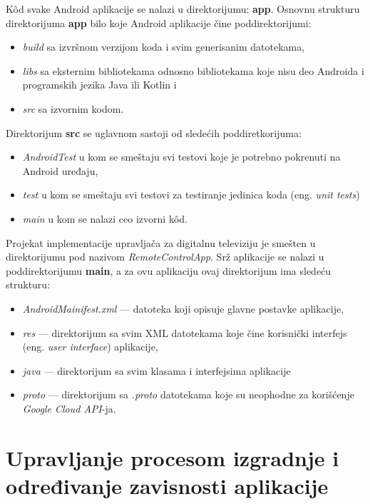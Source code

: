 \documentclass[implementacija.tex]{subfiles}
\begin{document}
K\^{o}d svake Android aplikacije se nalazi u direktorijumu: \textbf{app}. Osnovnu strukturu direktorijuma \textbf{app} bilo koje Android aplikacije čine poddirektorijumi: 

\begin{itemize}
\item \textit{build} sa izvršnom verzijom koda i svim generisanim datotekama,
\item \textit{libs} sa eksternim bibliotekama odnosno bibliotekama koje nisu deo Androida i programskih jezika Java ili Kotlin i
\item \textit{src} sa izvornim kodom.
\end{itemize}

 Direktorijum \textbf{src} se uglavnom sastoji od sledećih poddiretkorijuma: 
\begin{itemize}
\item \textit{AndroidTest} u kom se smeštaju svi testovi koje je potrebno pokrenuti na Android uređaju, 
\item \textit{test} u kom se smeštaju svi testovi za testiranje jedinica koda (eng. \textit{unit tests})
\item \textit{main} u kom se nalazi ceo izvorni k\^{o}d.
\end{itemize}

Projekat implementacije upravljača za digitalnu televiziju je smešten u direktorijumu pod nazivom \textit{RemoteControlApp}. Srž aplikacije se nalazi u poddirektorijumu \textbf{main}, a za ovu aplikaciju ovaj direktorijum ima sledeću strukturu:
\begin{itemize}
\item \textit{AndroidMainifest.xml} --- datoteka koji opisuje glavne postavke aplikacije,
\item \textit{res} --- direktorijum sa svim XML datotekama koje čine korisnički interfejs (eng. \textit{user interface}) aplikacije,
\item \textit{java} --- direktorijum sa svim klasama i interfejsima aplikacije
\item \textit{proto} --- direktorijum sa \textit{.proto} datotekama koje su neophodne za korišćenje \textit{Google Cloud API}-ja.
\end{itemize}

\section{Upravljanje procesom izgradnje i određivanje zavisnosti aplikacije}
\end{document}
